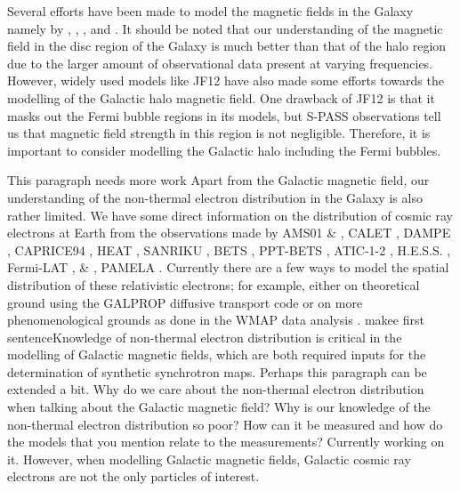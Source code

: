 \documentclass[usenatbib]{mnras}
\newcommand{\Arjen}[1]{{\color{brown}#1}}
\newcommand{\Vasu}[1]{{\color{purple}#1}}
\begin{document}

Several efforts have  been made to model the magnetic fields in the Galaxy namely by \cite{Jaffe_2010}, \cite{Jaffe_2011}, \cite{Sun_2008}, and \cite{JF12}. It should be noted that our understanding of the magnetic field in the disc region of the Galaxy is much better than that of the halo region due to the larger amount of observational data present at varying frequencies. However, widely used models like JF12 \cite{JF12} have also made some efforts towards the modelling of the Galactic halo magnetic field. One drawback of JF12 \cite{JF12} is that it masks out the Fermi bubble regions in its models, but S-PASS \cite{Carretti_2013} observations tell us that magnetic field strength in this region is not negligible. Therefore, it is important to consider modelling the Galactic halo including the Fermi bubbles.


\Vasu{This paragraph needs more work}
Apart from the Galactic magnetic field, our understanding of the non-thermal electron distribution in the Galaxy is also rather limited. We have some direct information on the distribution of cosmic ray electrons at Earth from the observations made by AMS01 \cite{AMS_2002} \& \cite{AMS_2014}, CALET \cite{Calet_2017}, DAMPE \cite{Dampe_2017}, CAPRICE94 \cite{CAPRICE_2001} , HEAT \cite{Heat_2001}, SANRIKU \cite{Sanriku_1999}, BETS \cite{Bets_2001}, PPT-BETS \cite{PPT_BETS}, ATIC-1-2 \cite{AITC_1_2}, H.E.S.S. \cite{HESS_2008} \cite{HESS_2009}, Fermi-LAT \cite{FERMI_2009}, \cite{FERMI_2010} \& \cite{Fermi_2017}, PAMELA \cite{Pamela}. Currently there are a few ways to model the spatial distribution of these relativistic electrons; for example, either on theoretical ground using the GALPROP diffusive transport code \cite{Hammurabi} \cite{Orlando_2011} or on more phenomenological grounds as done in the WMAP data analysis \cite{WMAP_Page}. \Vasu{makee first  sentence}Knowledge of non-thermal electron distribution is critical in the modelling of Galactic magnetic fields, which are both required inputs for the determination of synthetic synchrotron maps.  \Arjen{Perhaps this paragraph can be extended a bit. Why do we care about the non-thermal electron distribution when talking about the Galactic magnetic field? Why is our knowledge of the non-thermal electron distribution so poor? How can it be measured and how do the models that you mention relate to the measurements?} \Vasu{Currently working on it.}
However, when modelling Galactic magnetic fields, Galactic cosmic ray electrons are not the only particles of interest. 
\end{document}

